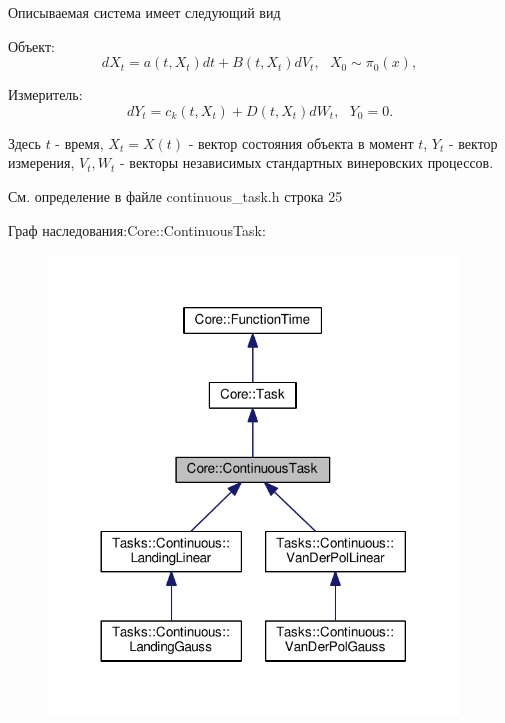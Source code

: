 Описываемая система имеет следующий вид


\begin{DoxyItemize}
\item Объект\+: \[dX_t = a(t, X_t)dt + B(t, X_t)dV_t,\ \ \ X_0 \sim \pi_0(x),\]
\item Измеритель\+: \[dY_t = c_k(t, X_t) + D(t, X_t)dW_t,\ \ \ Y_0 = 0.\]
\end{DoxyItemize}

Здесь $t$ -\/ время, $X_t = X(t)$ -\/ вектор состояния объекта в момент $t$, $Y_t$ -\/ вектор измерения, $V_t, W_t$ -\/ векторы независимых стандартных винеровских процессов. 

См. определение в файле continuous\+\_\+task.\+h строка 25



Граф наследования\+:Core\+:\+:Continuous\+Task\+:
\nopagebreak
\begin{figure}[H]
\begin{center}
\leavevmode
\includegraphics[width=308pt]{class_core_1_1_continuous_task__inherit__graph}
\end{center}
\end{figure}


